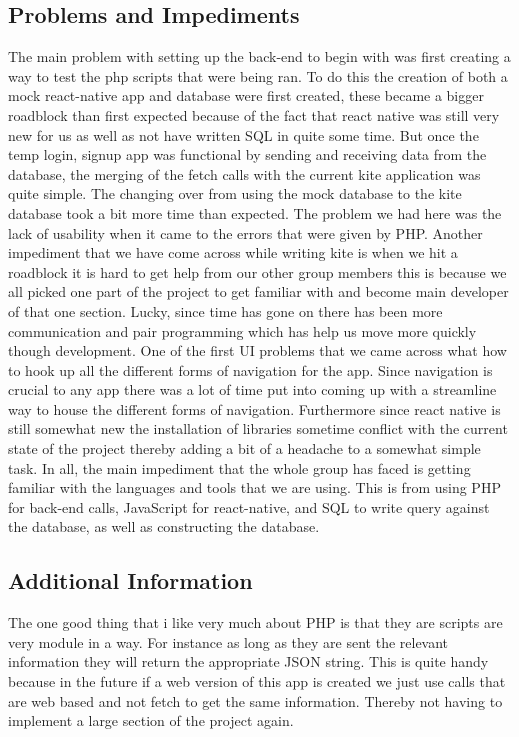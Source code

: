 \documentclass[compsoc, 10, draftclsnofoot, onecolumn]{IEEEtran}
\begin{document}
\subsection{Problems and Impediments}
The main problem with setting up the back-end to begin with was first creating a way to test the php scripts that were being ran. To do this the creation of both a mock react-native app and database were first created, these became a bigger roadblock than first expected because of the fact that react native was still very new for us as well as not have written SQL in quite some time. But once the temp login, signup app was functional by sending and receiving data from the database, the merging of the fetch calls with the current kite application was quite simple. The changing over from using the mock database to the kite database took a bit more time than expected. The problem we had here was the lack of usability when it came to the errors that were given by PHP. Another impediment that we have come across while writing kite is when we hit a roadblock it is hard to get help from our other group members this is because we all picked one part of the project to get familiar with and become main developer of that one section. Lucky, since time has gone on there has been more communication and pair programming which has help us move more quickly though development. One of the first UI problems that we came across what how to hook up all the different forms of navigation for the app. Since navigation is crucial to any app there was a lot of time put into coming up with a streamline way to house the different forms of navigation. Furthermore since react native is still somewhat new the installation of libraries sometime conflict with the current state of the project thereby adding a bit of a headache to a somewhat simple task. In all, the main impediment that the whole group has faced is getting familiar with the languages and tools that we are using. This is from using PHP for back-end calls, JavaScript for react-native, and SQL to write query against the database, as well as constructing the database.  

\subsection {Additional Information}
The one good thing that i like very much about PHP is that they are scripts are very module in a way. For instance as long as they are sent the relevant information they will return the appropriate JSON string. This is quite handy because in the future if a web version of this app is created we just use calls that are web based and not fetch to get the same information. Thereby not having to implement a large section of the project again.
\end{document}
